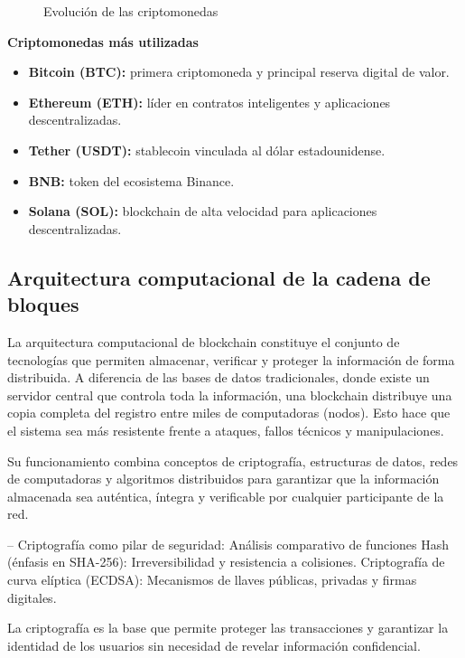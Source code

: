 \documentclass[12pt,a4paper]{article}
\begin{document}
\begin{figure}[H]
\centering
\caption{Evolución de las criptomonedas}
\end{figure}

\textbf{Criptomonedas más utilizadas}

\begin{itemize}
  \item \textbf{Bitcoin (BTC):} primera criptomoneda y principal reserva digital de valor.
  \item \textbf{Ethereum (ETH):} líder en contratos inteligentes y aplicaciones descentralizadas.
  \item \textbf{Tether (USDT):} stablecoin vinculada al dólar estadounidense.
  \item \textbf{BNB:} token del ecosistema Binance.
  \item \textbf{Solana (SOL):} blockchain de alta velocidad para aplicaciones descentralizadas.
\end{itemize}

\subsection{Arquitectura computacional de la cadena de bloques}

La arquitectura computacional de blockchain constituye el conjunto de tecnologías que permiten almacenar, verificar y proteger la información de forma distribuida. A diferencia de las bases de datos tradicionales, donde existe un servidor central que controla toda la información, una blockchain distribuye una copia completa del registro entre miles de computadoras (nodos). Esto hace que el sistema sea más resistente frente a ataques, fallos técnicos y manipulaciones.

Su funcionamiento combina conceptos de criptografía, estructuras de datos, redes de computadoras y algoritmos distribuidos para garantizar que la información almacenada sea auténtica, íntegra y verificable por cualquier participante de la red.

-- Criptografía como pilar de seguridad: Análisis comparativo de funciones Hash (énfasis en SHA-256): Irreversibilidad y resistencia a colisiones. Criptografía de curva elíptica (ECDSA): Mecanismos de llaves públicas, privadas y firmas digitales.

La criptografía es la base que permite proteger las transacciones y garantizar la identidad de los usuarios sin necesidad de revelar información confidencial.
\end{document}
